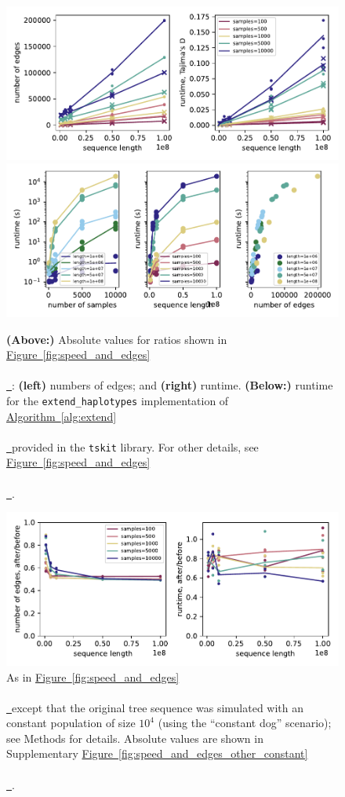 \documentclass[10pt,twoside,lineno]{gsajnl}
\newcommand{\tskit}{\texttt{tskit}}
\newcommand{\algorithmref}[2][]{%
	\hyperref[{#2}]{%
		Algorithm~\ref*{#2}%
		\ifx\\#1\\%
		\else
		\,#1%
		\fi
	}%
}
\newcommand*{\figref}[2][]{%
	\hyperref[{#2}]{%
		Figure~\ref*{#2}%
		\ifx\\#1\\%
		\else
		\,#1%
		\fi
	}%
}
\begin{document}
\begin{figure}
    \includegraphics{benchmarks/one_pop_results_absolute_values}
    \includegraphics{benchmarks/one_pop_results_timing}
    \caption{
        \textbf{(Above:)}
        Absolute values for ratios shown in \figref{fig:speed_and_edges}:
        \textbf{(left)} numbers of edges; and
        \textbf{(right)} runtime.
        \textbf{(Below:)} runtime for the \texttt{extend\_haplotypes}
        implementation of \algorithmref{alg:extend} provided in the \tskit{} library.
        For other details, see \figref{fig:speed_and_edges}.
        \label{fig:speed_and_edges_other}
    }
\end{figure}

\begin{figure}
    \includegraphics{benchmarks/constant_pop_results_ratios}
    \caption{
        As in \figref{fig:speed_and_edges} except that
        the original tree sequence was simulated with an constant population
        of size $10^4$ (using the ``constant dog'' scenario);
        see Methods for details.
        Absolute values are shown in Supplementary \figref{fig:speed_and_edges_other_constant}.
        \label{fig:speed_and_edges_constant}
    }
\end{figure}
\end{document}
